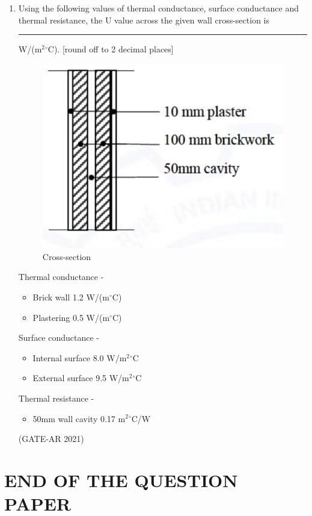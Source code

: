 \documentclass[a4paper,10pt]{article}
\begin{document}
\begin{enumerate}
    \item Using the following values of thermal conductance, surface conductance and thermal resistance, the U value across the given wall cross-section is \rule{2cm}{0.4pt} W/(m$^2$$^\circ$C). [round off to 2 decimal places] \\
    \begin{figure}[h!]
    \centering
    \includegraphics[width=0.5\columnwidth]{figs/12.jpg}
    \caption{Cross-section}
    \label{fig:Img12}
    \end{figure}
    \newpage
    Thermal conductance - \\
    \begin{itemize}
    \item Brick wall 1.2 W/(m$^\circ$C)
    \item Plastering 0.5 W/(m$^\circ$C)
    \end{itemize}
    Surface conductance - \\
    \begin{itemize}
    \item Internal surface 8.0 W/m$^2$$^\circ$C
    \item External surface 9.5 W/m$^2$$^\circ$C
    \end{itemize}
    Thermal resistance - \\
    \begin{itemize}
    \item 50mm wall cavity 0.17 m$^2$$^\circ$C/W
    \end{itemize}
    \hfill (GATE-AR 2021)
    
\end{enumerate}

\centering
\section*{END OF THE QUESTION PAPER}
\end{document}
